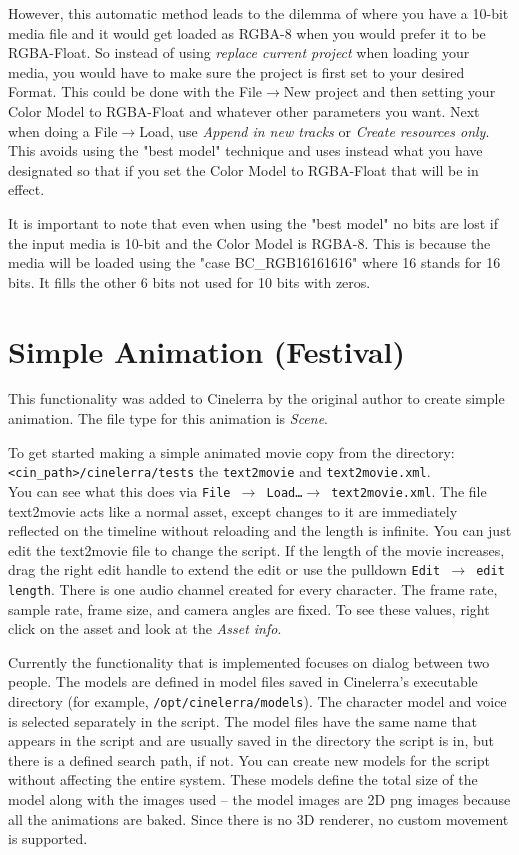 However, this automatic method leads to the dilemma of where you have a 10-bit media file and it would
get loaded as RGBA-8 when you would prefer it to be RGBA-Float.  So instead of using \textit{replace current
project} when loading your media, you would have to make sure the project is first set to your desired
Format.  This could be done with the File$\rightarrow$New project and then setting your Color
Model to RGBA-Float and whatever other parameters you want.  Next when doing a File$\rightarrow$Load, use
\textit{Append in new tracks} or \textit{Create resources only}. This avoids using the "best model"
technique and uses instead what you have designated so that if you set the Color Model to RGBA-Float that
will be in effect.

It is important to note that even when using the "best model" no bits are lost if the input media is 10-bit
and the Color Model is RGBA-8. This is because the media will be loaded using the "case BC\_RGB16161616"
where 16 stands for 16 bits. It fills the other 6 bits not used for 10 bits with zeros.

\section{Simple Animation (Festival)}%
\label{sec:simple_animation_festival}

This functionality was added to Cinelerra by the original author to create simple animation.  The file type for this animation is \textit{Scene}.

To get started making a simple animated movie copy from the directory:\\
\texttt{<cin\_path>/cinelerra/tests} the \texttt{text2movie} and \texttt{text2movie.xml}. \\
You can see what this does via \texttt{File $\rightarrow$ Load\dots $\rightarrow$ text2movie.xml}.  The file text2movie acts like a normal asset, except changes to it are immediately reflected on the timeline without reloading and the length is infinite.  You can just edit the text2movie file to change the script.  If the length of the movie increases, drag the right edit handle to extend the edit or use the pulldown \texttt{Edit $\rightarrow$ edit length}. There is one audio channel created for every character.  The frame rate, sample rate, frame size, and camera angles are fixed.  To see these values, right click on the asset and look at the \textit{Asset info}.

Currently the functionality that is implemented focuses on dialog between two people.  The models are defined in model files saved in Cinelerra's executable directory (for example, \texttt{/opt/cinelerra/models}).  The character model and voice is selected separately in the script.  The model files have the same name that appears in the script and are usually saved in the directory the script is in, but there is a defined search path, if not.  You can create new models for the script without affecting the entire system.  These models define the total size of the model along with the images used -- the model images are 2D png images because all the animations are baked.  Since there is no 3D renderer, no custom movement is supported.

